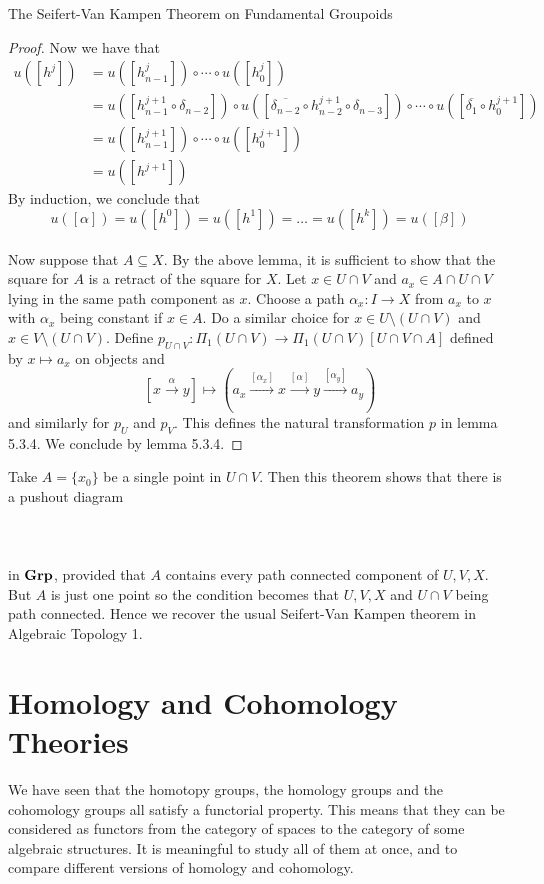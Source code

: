 \documentclass[a4paper]{article}
\begin{document}
\begin{thm}{The Seifert-Van Kampen Theorem on Fundamental Groupoids}{}
\begin{proof}
Now we have that 
\begin{align*}
u([h^j])&=u([h_{n-1}^j])\circ\cdots\circ u([h_0^j])\\
&=u([h_{n-1}^{j+1}\circ\delta_{n-2}])\circ u([\overline{\delta_{n-2}}\circ h_{n-2}^{j+1}\circ\delta_{n-3}])\circ\cdots\circ u([\overline{\delta_1}\circ h_0^{j+1}])\\
&=u([h_{n-1}^{j+1}])\circ\cdots\circ u([h_0^{j+1}])\\
&=u([h^{j+1}])
\end{align*}
By induction, we conclude that $$u([\alpha])=u([h^0])=u([h^1])=\dots=u([h^k])=u([\beta])$$~\\

Now suppose that $A\subseteq X$. By the above lemma, it is sufficient to show that the square for $A$ is a retract of the square for $X$. Let $x\in U\cap V$ and $a_x\in A\cap U\cap V$ lying in the same path component as $x$. Choose a path $\alpha_x:I\to X$ from $a_x$ to $x$ with $\alpha_x$ being constant if $x\in A$. Do a similar choice for $x\in U\setminus(U\cap V)$ and $x\in V\setminus(U\cap V)$. Define $p_{U\cap V}:\Pi_1(U\cap V)\to\Pi_1(U\cap V)[U\cap V\cap A]$ defined by $x\mapsto a_x$ on objects and $$[x\overset{\alpha}{\to} y]\mapsto\left(a_x\overset{[\alpha_x]}{\to}x\overset{[\alpha]}{\to}y\overset{[\alpha_y]}{\to}a_y\right)$$ and similarly for $p_U$ and $p_V$. This defines the natural transformation $p$ in lemma 5.3.4. We conclude by lemma 5.3.4. 
\end{proof}
\end{thm}

Take $A=\{x_0\}$ be a single point in $U\cap V$. Then this theorem shows that there is a pushout diagram \\~\\
\\~\\
in $\bold{Grp}$, provided that $A$ contains every path connected component of $U,V,X$. But $A$ is just one point so the condition becomes that $U,V,X$ and $U\cap V$ being path connected. Hence we recover the usual Seifert-Van Kampen theorem in Algebraic Topology 1. 

\pagebreak
\section{Homology and Cohomology Theories}
We have seen that the homotopy groups, the homology groups and the cohomology groups all satisfy a functorial property. This means that they can be considered as functors from the category of spaces to the category of some algebraic structures. It is meaningful to study all of them at once, and to compare different versions of homology and cohomology. \\~\\
\end{document}
